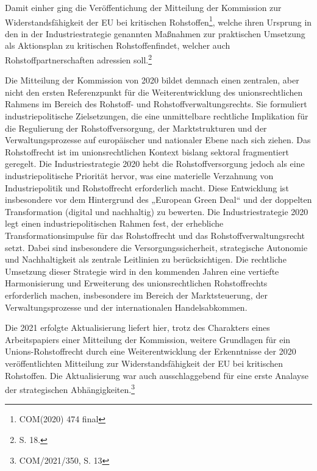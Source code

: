 \documentclass[12pt,a4paper,oneside]{book} %
\begin{document}
Damit einher ging die Veröffentichung der Mitteilung der Kommission zur \glqq Widerstandsfähigkeit der EU bei kritischen Rohstoffen\grqq\footnote{COM(2020) 474 final}, welche ihren Ursprung in den in der Industriestrategie genannten Maßnahmen zur praktischen Umsetzung als \glqq Aktionsplan zu kritischen Rohstoffen\glqq findet, welcher auch Rohstoffpartnerschaften adressien soll.\footnote{S. 18.}

Die Mitteilung der Kommission von 2020 bildet demnach einen zentralen, aber nicht den ersten Referenzpunkt für die Weiterentwicklung des unionsrechtlichen Rahmens im Bereich des Rohstoff- und Rohstoffverwaltungsrechts. Sie formuliert industriepolitische Zielsetzungen, die eine unmittelbare rechtliche Implikation für die Regulierung der Rohstoffversorgung, der Marktstrukturen und der Verwaltungsprozesse auf europäischer und nationaler Ebene nach sich ziehen. Das Rohstoffrecht ist im unionsrechtlichen Kontext bislang sektoral fragmentiert geregelt. Die Industriestrategie 2020 hebt die Rohstoffversorgung jedoch als eine industriepolitische Priorität hervor, was eine materielle Verzahnung von Industriepolitik und Rohstoffrecht erforderlich macht. Diese Entwicklung ist insbesondere vor dem Hintergrund des „European Green Deal“ und der doppelten Transformation (digital und nachhaltig) zu bewerten. Die Industriestrategie 2020 legt einen industriepolitischen Rahmen fest, der erhebliche Transformationsimpulse für das Rohstoffrecht und das Rohstoffverwaltungsrecht setzt. Dabei sind insbesondere die Versorgungssicherheit, strategische Autonomie und Nachhaltigkeit als zentrale Leitlinien zu berücksichtigen. Die rechtliche Umsetzung dieser Strategie wird in den kommenden Jahren eine vertiefte Harmonisierung und Erweiterung des unionsrechtlichen Rohstoffrechts erforderlich machen, insbesondere im Bereich der Marktsteuerung, der Verwaltungsprozesse und der internationalen Handelsabkommen.

Die 2021 erfolgte Aktualisierung liefert hier, trotz des Charakters eines Arbeitspapiers einer Mitteilung der Kommission, weitere Grundlagen für ein Unions-Rohstoffrecht durch eine Weiterentwicklung der Erkenntnisse der 2020 veröffentlichten Mitteilung zur Widerstandsfähigkeit der EU bei kritischen Rohstoffen. Die Aktualisierung war auch ausschlaggebend für eine erste Analayse der strategischen Abhängigkeiten.\footnote{COM/2021/350, S. 13}
\end{document}
